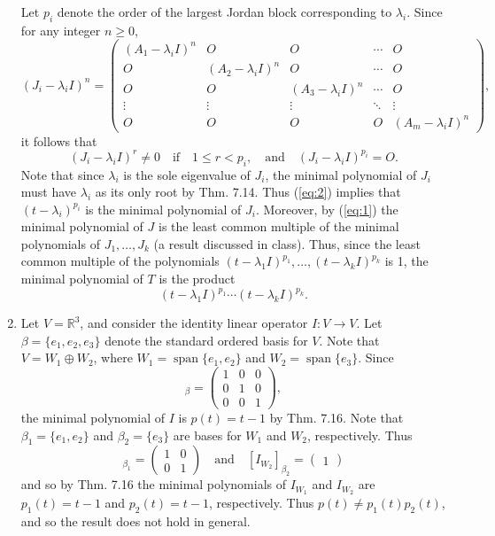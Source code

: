 \documentclass[12pt]{article}
\DeclareMathOperator{\spn}{span}
\begin{document}
\begin{enumerate}
Let $p_i$ denote the order of the largest Jordan block corresponding to $\lambda_i$. Since for any integer $n \geq 0$,
\begin{equation*}
(J_i - \lambda_i I)^n = \begin{pmatrix}
(A_1 - \lambda_iI)^n & O & O & \cdots & O \\
O & (A_2 - \lambda_iI)^n & O & \cdots & O \\
O & O & (A_3 - \lambda_iI)^n & \cdots & O \\
\vdots & \vdots & \vdots & \ddots & \vdots \\
O & O & O & O & (A_m - \lambda_iI)^n
\end{pmatrix},
\end{equation*}
it follows that
\begin{equation} \label{eq:2}
(J_i - \lambda_i I)^r \neq 0 \quad \text{if} \quad 1 \leq r < p_i, \quad \text{and} \quad (J_i - \lambda_i I)^{p_i} = O.
\end{equation}
Note that since $\lambda_i$ is the sole eigenvalue of $J_i$, the minimal polynomial of $J_i$ must have $\lambda_i$ as its only root by Thm. 7.14. Thus (\ref{eq:2}) implies that $(t - \lambda_i)^{p_i}$ is the minimal polynomial of $J_i$. Moreover, by (\ref{eq:1}) the minimal polynomial of $J$ is the least common multiple of the minimal polynomials of $J_1, \dots, J_k$ (a result discussed in class). Thus, since the least common multiple of the polynomials $(t - \lambda_1I)^{p_1}, \dots, (t - \lambda_kI)^{p_k}$ is 1, the minimal polynomial of $T$ is the product
\begin{equation*}
(t - \lambda_1I)^{p_1} \cdots (t - \lambda_kI)^{p_k}.
\end{equation*}

\setcounter{enumi}{13}
\item
Let $V = \mathbb{R}^3$, and consider the identity linear operator $I : V \to V$. Let $\beta = \{e_1, e_2, e_3\}$ denote the standard ordered basis for $V$. Note that $V = W_1 \oplus W_2$, where $W_1 = \spn\{e_1, e_2\}$ and $W_2 = \spn\{e_3\}$. Since
\begin{equation*}
[I]_\beta = \begin{pmatrix}
1 & 0 & 0 \\
0 & 1 & 0 \\
0 & 0 & 1
\end{pmatrix},
\end{equation*}
the minimal polynomial of $I$ is $p(t) = t - 1$ by Thm. 7.16. Note that $\beta_1 = \{e_1, e_2\}$ and $\beta_2 = \{e_3\}$ are bases for $W_1$ and $W_2$, respectively. Thus
\begin{equation*}
[I_{W_1}]_{\beta_1} = \begin{pmatrix}
1 & 0 \\
0 & 1
\end{pmatrix} \quad \text{and} \quad
[I_{W_2}]_{\beta_2} = \begin{pmatrix}
1
\end{pmatrix}
\end{equation*}
and so by Thm. 7.16 the minimal polynomials of $I_{W_1}$ and $I_{W_2}$ are $p_1(t) = t - 1$ and $p_2(t) = t - 1$, respectively. Thus $p(t) \neq p_1(t) p_2(t)$, and so the result does not hold in general.


\end{enumerate}
\end{document}

